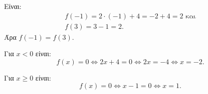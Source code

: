 
\begin{alist}
\item Είναι:
\begin{gather*}
f(-1) = 2 \cdot (-1) + 4 = -2 + 4 = 2\text{ και} \\
f(3) = 3 - 1 = 2.
\end{gather*}
Άρα $f(-1) = f(3)$.

\item Για $x < 0$ είναι:
\[f(x) = 0 \Leftrightarrow 2x + 4 = 0 \Leftrightarrow 2x = -4 \Leftrightarrow x = -2.\]

Για $x \ge 0$ είναι:
\[f(x) = 0 \Leftrightarrow x - 1 = 0 \Leftrightarrow x = 1.\]
\end{alist}

